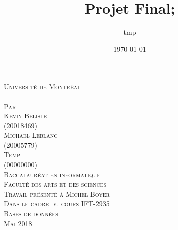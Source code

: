 \documentclass[a4paper,12pt]{article}
\date{\today}
\title{Projet Final;}
\author{tmp}
\newcommand{\Author}{Kevin Belisle}
\newcommand{\Authorr}{Michael Leblanc}
\newcommand{\Authorrr}{Temp}
\newcommand{\Teacher}{Michel Boyer}
\newcommand{\ClassNum}{IFT-2935}
\newcommand{\ClassName}{Bases de données}
\newcommand{\DateMMMMYYYY}{Mai 2018}
\begin{document}
	\begin{titlepage} 
		\begin{center}
			\textsc{\normalsize Université de Montréal}\\[2.25cm]
			 
			\textsc{\LARGE \@title}\\[2.25cm]
			
			\textsc{\small Par}\\[0.25cm]
			\textsc{\LARGE \Author}\\[0.25cm]
			\textsc{\normalsize (20018469)}\\[0.25cm]
			\textsc{\LARGE \Authorr}\\[0.25cm]
			\textsc{\normalsize (20005779)}\\[0.25cm]
			\textsc{\LARGE \Authorrr}\\[0.25cm]
			\textsc{\normalsize (00000000)}\\[2cm]
			
			\textsc{\normalsize Baccalauréat en informatique}\\
			\textsc{\normalsize Faculté des arts et des sciences}\\[2.25cm]
			
			\textsc{\small Travail présenté à \Teacher}\\
			\textsc{\small Dans le cadre du cours \ClassNum}\\
			\textsc{\small \ClassName}\\[2.25cm]
			
			\textsc{\normalsize \DateMMMMYYYY}\\[1.5cm]
		\end{center}
	\end{titlepage}
\end{document}
